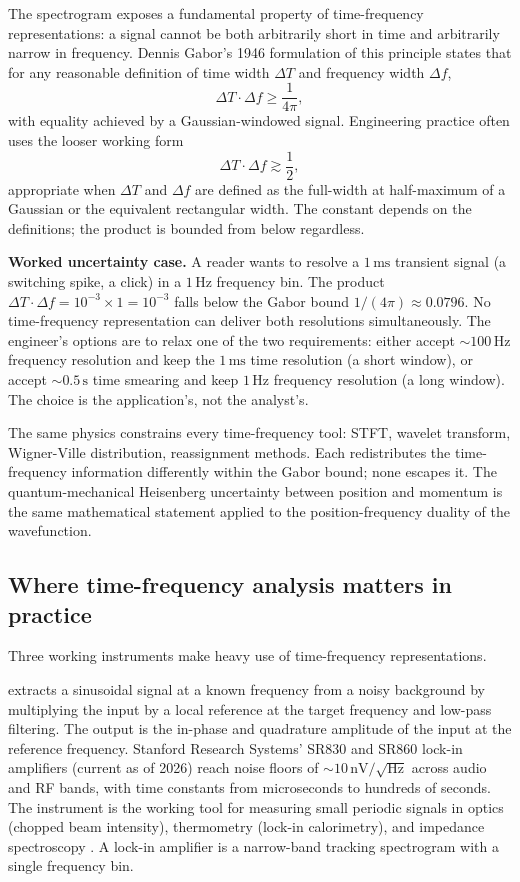 The spectrogram exposes a fundamental property of time-frequency
representations: a signal cannot be both arbitrarily short in
time and arbitrarily narrow in frequency. Dennis Gabor's 1946
formulation \cite{text:ch06t3-gabor-1946} of this principle states
that for any reasonable definition of time width $\Delta T$ and
frequency width $\Delta f$,
\[
\Delta T \cdot \Delta f \geq \frac{1}{4\pi},
\]
with equality achieved by a Gaussian-windowed signal. Engineering
practice often uses the looser working form
\[
\Delta T \cdot \Delta f \gtrsim \frac{1}{2},
\]
appropriate when $\Delta T$ and $\Delta f$ are defined as the
full-width at half-maximum of a Gaussian or the equivalent
rectangular width. The constant depends on the definitions; the
product is bounded from below regardless.

\textbf{Worked uncertainty case.} A reader wants to resolve a $1
\,\si{\milli\second}$ transient signal (a switching spike, a click)
in a $1 \,\si{\hertz}$ frequency bin. The product $\Delta T \cdot
\Delta f = 10^{-3} \times 1 = 10^{-3}$ falls below the Gabor
bound $1/(4\pi) \approx 0.0796$. No time-frequency representation
can deliver both resolutions simultaneously. The engineer's
options are to relax one of the two requirements: either accept
$\sim 100 \,\si{\hertz}$ frequency resolution and keep the $1
\,\si{\milli\second}$ time resolution (a short window), or accept
$\sim 0.5 \,\si{\second}$ time smearing and keep $1 \,\si{\hertz}$
frequency resolution (a long window). The choice is the
application's, not the analyst's.

The same physics constrains every time-frequency tool: STFT,
wavelet transform, Wigner-Ville distribution, reassignment
methods. Each redistributes the time-frequency information
differently within the Gabor bound; none escapes it. The
quantum-mechanical Heisenberg uncertainty between position and
momentum is the same mathematical statement applied to the
position-frequency duality of the wavefunction.

\subsection{Where time-frequency analysis matters in practice}

Three working instruments make heavy use of time-frequency
representations.

 extracts a sinusoidal signal at a known
frequency from a noisy background by multiplying the input by a
local reference at the target frequency and low-pass filtering.
The output is the in-phase and quadrature amplitude of the input
at the reference frequency. Stanford Research Systems' SR830 and
SR860 lock-in amplifiers (current as of 2026) reach noise floors
of $\sim 10 \,\si{\nano\volt}/\sqrt{\si{\hertz}}$ across audio and
RF bands, with time constants from microseconds to hundreds of
seconds. The instrument is the working tool for measuring small
periodic signals in optics (chopped beam intensity), thermometry
(lock-in calorimetry), and impedance spectroscopy
\cite{text:ch06t3-pozar-microwave-2011}. A lock-in amplifier is a
narrow-band tracking spectrogram with a single frequency bin.


